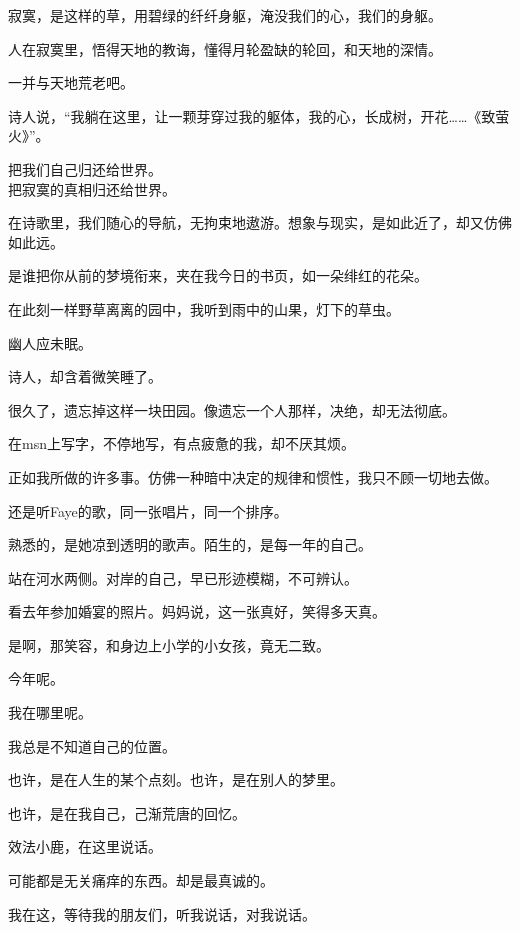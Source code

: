 \documentclass[12pt,a4paper]{article}
\def\blankrev{\vspace{1ex}}									%
\begin{document}
		\blankrev
		寂寞，是这样的草，用碧绿的纤纤身躯，淹没我们的心，我们的身躯。\par
		人在寂寞里，悟得天地的教诲，懂得月轮盈缺的轮回，和天地的深情。\par
		一并与天地荒老吧。\par
		诗人说，“我躺在这里，让一颗芽穿过我的躯体，我的心，长成树，开花……《致萤火》”。

		\longpoem{}{}{}
		把我们自己归还给世界。\\
		把寂寞的真相归还给世界。
		\endlongpoem

		在诗歌里，我们随心的导航，无拘束地遨游。想象与现实，是如此近了，却又仿佛如此远。

		\blankrev
		是谁把你从前的梦境衔来，夹在我今日的书页，如一朵绯红的花朵。\par
		在此刻一样野草离离的园中，我听到雨中的山果，灯下的草虫。\par
		幽人应未眠。\par
		诗人，却含着微笑睡了。

	\endwriting



		很久了，遗忘掉这样一块田园。像遗忘一个人那样，决绝，却无法彻底。\par
		在msn上写字，不停地写，有点疲惫的我，却不厌其烦。\par
		正如我所做的许多事。仿佛一种暗中决定的规律和惯性，我只不顾一切地去做。\par
		还是听Faye的歌，同一张唱片，同一个排序。\par
		熟悉的，是她凉到透明的歌声。陌生的，是每一年的自己。\par
		站在河水两侧。对岸的自己，早已形迹模糊，不可辨认。\par
		看去年参加婚宴的照片。妈妈说，这一张真好，笑得多天真。\par
		是啊，那笑容，和身边上小学的小女孩，竟无二致。\par
		今年呢。\par
		我在哪里呢。\par
		我总是不知道自己的位置。\par
		也许，是在人生的某个点刻。也许，是在别人的梦里。\par
		也许，是在我自己，己渐荒唐的回忆。

		\blankrev
		效法小鹿，在这里说话。\par
		可能都是无关痛痒的东西。却是最真诚的。

		我在这，等待我的朋友们，听我说话，对我说话。
\end{document}

